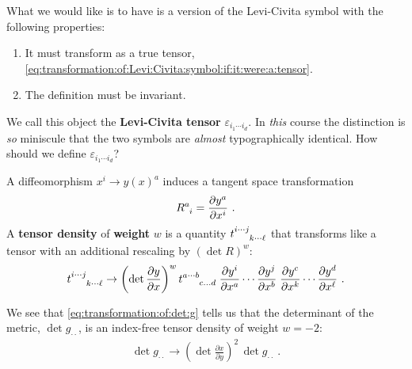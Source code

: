 \documentclass[12pt, oneside]{report}    %
\begin{document}
\begin{subappendices}
What we would like is to have is a version of the Levi-Civita symbol with the following properties:
\begin{enumerate}
    \item It must transform as a true tensor, \eqref{eq:transformation:of:Levi:Civita:symbol:if:it:were:a:tensor}.
    \item The definition must be invariant.
\end{enumerate}
We call this object the \textbf{Levi-Civita tensor} $\varepsilon_{i_1\cdots i_d}$. 
% 
In \emph{this} course the distinction is \emph{so} miniscule that the two symbols are \emph{almost} typographically identical. How should we define $\varepsilon_{i_1\cdots i_d}$?

A diffeomorphism $x^i \to y(x)^a$ induces a tangent space transformation
\begin{align}
R\aij{a}{i} = \frac{\partial y^a}{\partial x^i}     \ .
\end{align}
A \textbf{tensor density} of \textbf{weight} $w$ is a quantity $t\aij{i\cdots j}{k\cdots \ell}$ that transforms like a tensor with an additional rescaling by $(\det R)^w$:
\begin{align}
    t\aij{i\cdots j}{k\cdots \ell} \to 
    \left(\det \frac{\partial y}{\partial x}\right)^w
    t\aij{a\cdots b}{c\dots d}
    \;
    \frac{\partial y^i}{\partial x^a}
    \cdots
    \frac{\partial y^j}{\partial x^b}\;
    \frac{\partial y^c}{\partial x^k}
    \cdots
    \frac{\partial y^d}{\partial x^\ell} \ .
\end{align}
\begin{example}
We see that \eqref{eq:transformation:of:det:g} tells us that the determinant of the metric,\sidenotemark{} $\det g_{\cdot\cdot}$, is an index-free tensor density of weight $w=-2$:
\begin{align}
    \det g_{\cdot\cdot} \to \left(\det \frac{\partial x}{\partial y}\right)^2\, \det g_{\cdot\cdot}
    \label{eq:det:g:tensor:density}
    \ .
\end{align}
\end{example}


\end{subappendices}
\end{document}
